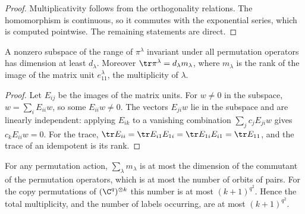 \begin{proof}\leanok
    Multiplicativity follows from the orthogonality relations. The
    homomorphism is continuous, so it commutes with the exponential series,
    which is computed pointwise. The remaining statements are direct.
\end{proof}

\begin{lemma}
    \label{lem:isotypic_dimension}
    \leanok
    A nonzero subspace of the range of $\pi^\lambda$ invariant under all
    permutation operators has dimension at least $d_\lambda$. Moreover
    $\tr\pi^\lambda=d_\lambda m_\lambda$, where $m_\lambda$ is the rank of the
    image of the matrix unit $e^\lambda_{11}$, the multiplicity of $\lambda$.
\end{lemma}

\begin{proof}\leanok
    Let $E_{ij}$ be the images of the matrix units. For $w\ne0$ in the
    subspace, $w=\sum_iE_{ii}w$, so some $E_{ii}w\ne0$. The vectors $E_{ji}w$
    lie in the subspace and are linearly independent: applying $E_{ik}$ to a
    vanishing combination $\sum_jc_jE_{ji}w$ gives $c_kE_{ii}w=0$. For the
    trace, $\tr E_{ii}=\tr E_{i1}E_{1i}=\tr E_{1i}E_{i1}=\tr E_{11}$, and the
    trace of an idempotent is its rank.
\end{proof}

\begin{lemma}
    \label{lem:multiplicity_count}
    \leanok
    For any permutation action, $\sum_\lambda m_\lambda$ is at most the
    dimension of the commutant of the permutation operators, which is at most
    the number of orbits of pairs. For the copy permutations of
    $(\C^q)^{\otimes k}$ this number is at most $(k+1)^{q^2}$. Hence the total
    multiplicity, and the number of labels occurring, are at most
    $(k+1)^{q^2}$.
\end{lemma}

